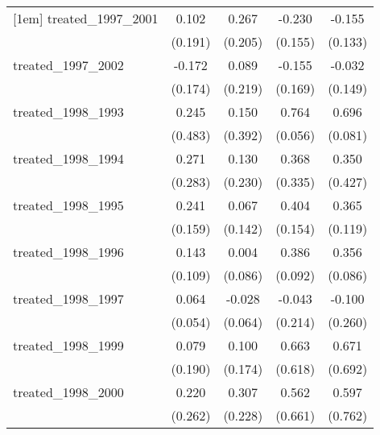 {\begin{tabular}{l*{4}{c}}
[1em]
treated\_1997\_2001&       0.102         &       0.267         &      -0.230         &      -0.155         \\
            &     (0.191)         &     (0.205)         &     (0.155)         &     (0.133)         \\
[1em]
treated\_1997\_2002&      -0.172         &       0.089         &      -0.155         &      -0.032         \\
            &     (0.174)         &     (0.219)         &     (0.169)         &     (0.149)         \\
[1em]
treated\_1998\_1993&       0.245         &       0.150         &       0.764\sym{***}&       0.696\sym{***}\\
            &     (0.483)         &     (0.392)         &     (0.056)         &     (0.081)         \\
[1em]
treated\_1998\_1994&       0.271         &       0.130         &       0.368         &       0.350         \\
            &     (0.283)         &     (0.230)         &     (0.335)         &     (0.427)         \\
[1em]
treated\_1998\_1995&       0.241         &       0.067         &       0.404\sym{**} &       0.365\sym{**} \\
            &     (0.159)         &     (0.142)         &     (0.154)         &     (0.119)         \\
[1em]
treated\_1998\_1996&       0.143         &       0.004         &       0.386\sym{***}&       0.356\sym{***}\\
            &     (0.109)         &     (0.086)         &     (0.092)         &     (0.086)         \\
[1em]
treated\_1998\_1997&       0.064         &      -0.028         &      -0.043         &      -0.100         \\
            &     (0.054)         &     (0.064)         &     (0.214)         &     (0.260)         \\
[1em]
treated\_1998\_1999&       0.079         &       0.100         &       0.663         &       0.671         \\
            &     (0.190)         &     (0.174)         &     (0.618)         &     (0.692)         \\
[1em]
treated\_1998\_2000&       0.220         &       0.307         &       0.562         &       0.597         \\
            &     (0.262)         &     (0.228)         &     (0.661)         &     (0.762)         \\

\end{tabular}}
